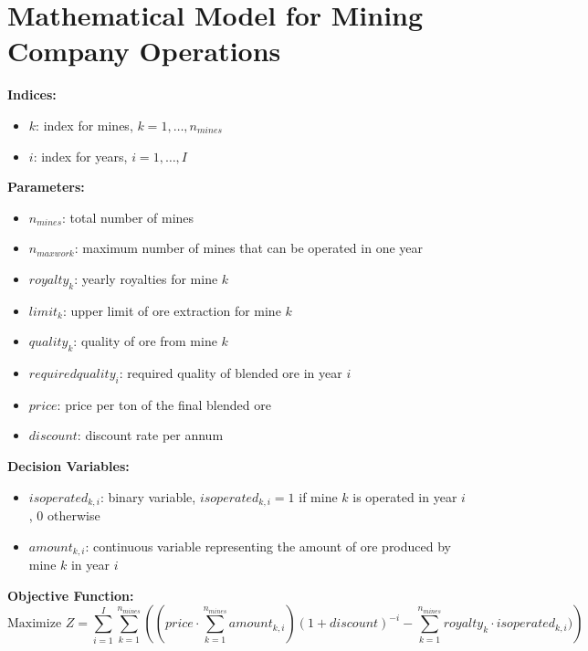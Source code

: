 \documentclass{article}
\begin{document}
\section*{Mathematical Model for Mining Company Operations}

\textbf{Indices:}
\begin{itemize}
    \item $k$: index for mines, $k = 1, \ldots, n_{mines}$
    \item $i$: index for years, $i = 1, \ldots, I$
\end{itemize}

\textbf{Parameters:}
\begin{itemize}
    \item $n_{mines}$: total number of mines
    \item $n_{maxwork}$: maximum number of mines that can be operated in one year
    \item $royalty_k$: yearly royalties for mine $k$
    \item $limit_k$: upper limit of ore extraction for mine $k$
    \item $quality_k$: quality of ore from mine $k$
    \item $requiredquality_i$: required quality of blended ore in year $i$
    \item $price$: price per ton of the final blended ore
    \item $discount$: discount rate per annum
\end{itemize}

\textbf{Decision Variables:}
\begin{itemize}
    \item $isoperated_{k,i}$: binary variable, $isoperated_{k,i} = 1$ if mine $k$ is operated in year $i$, $0$ otherwise
    \item $amount_{k,i}$: continuous variable representing the amount of ore produced by mine $k$ in year $i$
\end{itemize}

\textbf{Objective Function:}
\[
\text{Maximize } Z = \sum_{i=1}^{I}\sum_{k=1}^{n_{mines}} \left( (price \cdot \sum_{k=1}^{n_{mines}} amount_{k,i}) (1 + discount)^{-i} - \sum_{k=1}^{n_{mines}} royalty_k \cdot isoperated_{k,i}) \right)
\]
\end{document}

